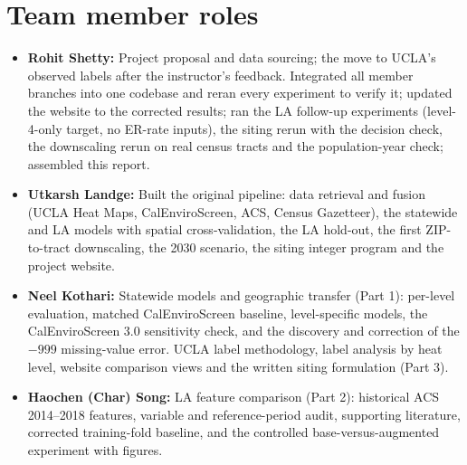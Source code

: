 \documentclass[10pt]{article}
\begin{document}
\section*{Team member roles}
\begin{itemize}
\item \textbf{Rohit Shetty:} Project proposal and data sourcing; the move to UCLA's observed labels after the instructor's feedback. Integrated all member branches into one codebase and reran every experiment to verify it; updated the website to the corrected results; ran the LA follow-up experiments (level-4-only target, no ER-rate inputs), the siting rerun with the decision check, the downscaling rerun on real census tracts and the population-year check; assembled this report.
\item \textbf{Utkarsh Landge:} Built the original pipeline: data retrieval and fusion (UCLA Heat Maps, CalEnviroScreen, ACS, Census Gazetteer), the statewide and LA models with spatial cross-validation, the LA hold-out, the first ZIP-to-tract downscaling, the 2030 scenario, the siting integer program and the project website.
\item \textbf{Neel Kothari:} Statewide models and geographic transfer (Part 1): per-level evaluation, matched CalEnviroScreen baseline, level-specific models, the CalEnviroScreen 3.0 sensitivity check, and the discovery and correction of the $-999$ missing-value error. UCLA label methodology, label analysis by heat level, website comparison views and the written siting formulation (Part 3).
\item \textbf{Haochen (Char) Song:} LA feature comparison (Part 2): historical ACS 2014--2018 features, variable and reference-period audit, supporting literature, corrected training-fold baseline, and the controlled base-versus-augmented experiment with figures.
\end{itemize}
\end{document}
